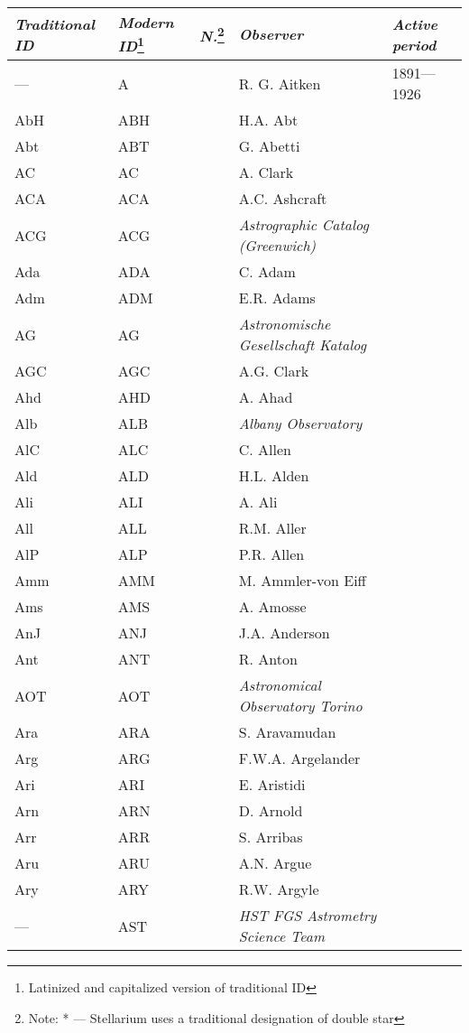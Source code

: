 \begin{longtable}{l|l|c|p{59mm}|l}\toprule
\emph{Traditional ID} & \emph{Modern ID}\footnote{Latinized and capitalized version of traditional ID} & \emph{N.}\footnote{Note: * --- Stellarium uses a traditional designation of double star} & \emph{Observer} & \emph{Active period} \\\midrule
--- & A   	&   & R. G. Aitken & 1891---1926 \\
AbH & ABH &   & H.A. Abt & \\
Abt & ABT &   & G. Abetti & \\
AC	& AC  &   & A. Clark & \\
ACA	& ACA &   & A.C. Ashcraft & \\
ACG	& ACG &   & \emph{Astrographic Catalog (Greenwich)} & \\
Ada & ADA &   & C. Adam & \\
Adm & ADM &   & E.R. Adams & \\
AG  & AG  &   & \emph{Astronomische Gesellschaft Katalog} & \\
AGC & AGC &   & A.G. Clark & \\
Ahd & AHD &   & A. Ahad & \\
Alb & ALB &   & \emph{Albany Observatory} & \\
AlC & ALC &   & C. Allen & \\
Ald & ALD &   & H.L. Alden & \\
Ali & ALI &   & A. Ali & \\
All & ALL &   & R.M. Aller & \\
AlP & ALP &   & P.R. Allen & \\
Amm & AMM &   & M. Ammler-von Eiff & \\
Ams & AMS &   & A. Amosse & \\
AnJ & ANJ &   & J.A. Anderson & \\
Ant & ANT &   & R. Anton & \\
AOT & AOT &   & \emph{Astronomical Observatory Torino} & \\
Ara & ARA &   & S. Aravamudan & \\
Arg	& ARG &   & F.W.A. Argelander & \\
Ari & ARI &   & E. Aristidi & \\
Arn & ARN &   & D. Arnold & \\
Arr & ARR &   & S. Arribas & \\
Aru & ARU &   & A.N. Argue & \\
Ary & ARY &   & R.W. Argyle & \\
--- & AST &   & \emph{HST FGS Astrometry Science Team} & \\

\end{longtable}
